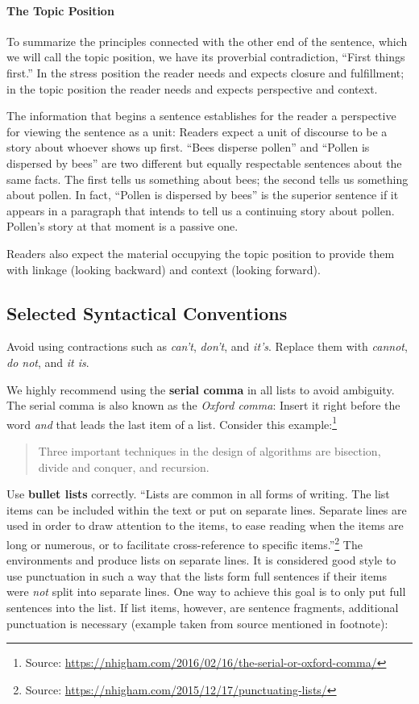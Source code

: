 \paragraph{The Topic Position}

To summarize the principles connected with the other end of the sentence, which we will call the topic position, we have its proverbial contradiction, “First things first.”
In the stress position the reader needs and expects closure and fulfillment; in the topic position the reader needs and expects perspective and context.

The information that begins a sentence establishes for the reader a perspective for viewing the sentence as a unit: Readers expect a unit of discourse to be a story about whoever shows up first. “Bees disperse pollen” and “Pollen is dispersed by bees” are two different but equally respectable sentences about the same facts. The first tells us something about bees; the second tells us something about pollen. In fact, “Pollen is dispersed by bees” is the superior sentence if it appears in a paragraph that intends to tell us a continuing story about pollen. Pollen’s story at that moment is a passive one.

Readers also expect the material occupying the topic position to provide them with linkage (looking backward) and context (looking forward).

\subsection{Selected Syntactical Conventions}

Avoid using contractions such as \emph{can't}, \emph{don't}, and \emph{it's}. Replace them with \emph{cannot}, \emph{do not}, and \emph{it is}.

We highly recommend using the \textbf{serial comma} in all lists to avoid ambiguity. The serial comma is also known as the \emph{Oxford comma}: Insert  it right before the word \emph{and} that leads the last item of a list. Consider this example:\footnote{Source: \url{https://nhigham.com/2016/02/16/the-serial-or-oxford-comma/}}
\begin{quote}
  Three important techniques in the design of algorithms are bisection, divide and conquer, and recursion.
\end{quote}

Use \textbf{bullet lists} correctly. ``Lists are common in all forms of writing. The list items can be included within the text or put on separate lines. Separate lines are used in order to draw attention to the items, to ease reading when the items are long or numerous, or to facilitate cross-reference to specific items.''\footnote{Source: \url{https://nhigham.com/2015/12/17/punctuating-lists/}} The environments  and  produce lists on separate lines. It is considered good style to use punctuation in such a way that the lists form full sentences if their items were \emph{not} split into separate lines. One way to achieve this goal is to only put full sentences into the list. If list items, however, are sentence fragments, additional punctuation is necessary (example taken from source mentioned in footnote):


